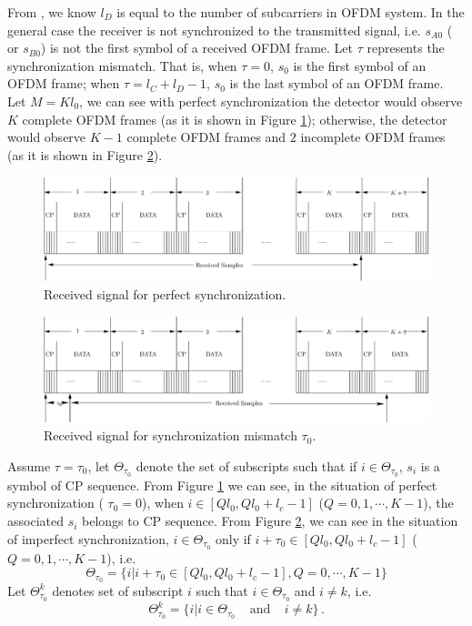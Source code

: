 From \cite{goldsmith2005wireless}, we know $l_D$ is equal to the number of subcarriers in OFDM system. 
In the general case the receiver is not synchronized to the transmitted signal, i.e. $s_{A0}$ ( or $s_{B0}$) is not the first symbol of a received OFDM frame. Let $\tau$ represents the synchronization mismatch. That is, when $\tau = 0$, $s_0$ is the first symbol of an OFDM frame; when $\tau = l_C+l_D -1$, $s_0$ is the last symbol of an OFDM frame. Let $M = Kl_0$, we can see with perfect synchronization the detector would observe $K$ complete  OFDM frames (as it is shown in Figure \ref{pic:1222ext0}); otherwise, the detector would observe $K-1$ complete OFDM frames and $2$ incomplete OFDM frames (as it is shown in Figure \ref{pic:1222a2}). 
\begin{figure}[!t]
  \centering 
  \includegraphics[width=\textwidth]{4/fig2.eps}
  \caption{Received signal for perfect synchronization.}
  \label{pic:1222ext0}
\end{figure}

\begin{figure}[!t]
  \centering 
  \includegraphics[width=\textwidth]{4/fig3.eps}
  \caption{Received signal for synchronization mismatch $\tau_0$.}
  \label{pic:1222a2}
\end{figure}
Assume $\tau = \tau_0$, let $\Theta_{\tau_0}$ denote the set of subscripts such that if $i \in \Theta_{\tau_0}$,  $s_i$ is a symbol of CP sequence. From Figure \ref{pic:1222ext0} we can see, in the situation of perfect synchronization ( $\tau_0 =0$), when $i \in [Ql_0, Ql_0+l_c-1]$ ($Q = 0, 1, \cdots, K-1$), the associated $s_i$ belongs to CP sequence. 
From Figure \ref{pic:1222a2}, we can see in the situation of imperfect synchronization, $i \in \Theta_{\tau_0}$ only if $i + \tau_0 \in [Ql_0, Ql_0+l_c -1]$ ($Q = 0, 1, \cdots, K-1$), i.e.
\begin{equation}
  \Theta_{\tau_0} = \{
i | i + \tau_0 \in [Ql_0, Ql_0+l_c -1], Q = 0, \cdots, K-1
  \}
\end{equation}
Let $\Theta_{\tau_0}^k$ denotes set of subscript $i$ such that  $i \in \Theta_{\tau_0}$ and $i \neq k$, i.e.
\begin{equation}
  \Theta_{\tau_0}^k =  \{i | i \in \Theta_{\tau_0} \;\;\;\; \text{and}\;\;\;\; i\neq k\}\,.
  \label{definitionoftau0k}
\end{equation}

